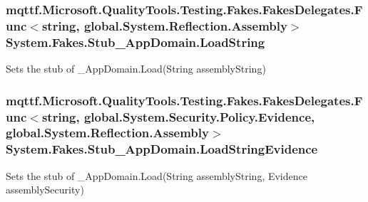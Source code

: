 \hypertarget{class_system_1_1_fakes_1_1_stub___app_domain_ad13b6d5b06033084171149e73dc4bdf8}{
\subsubsection[{Load\-String}]{\setlength{\rightskip}{0pt plus 5cm}mqttf.\-Microsoft.\-Quality\-Tools.\-Testing.\-Fakes.\-Fakes\-Delegates.\-Func$<$string, global.\-System.\-Reflection.\-Assembly$>$ System.\-Fakes.\-Stub\-\_\-\-App\-Domain.\-Load\-String}}\label{class_system_1_1_fakes_1_1_stub___app_domain_ad13b6d5b06033084171149e73dc4bdf8}


Sets the stub of \-\_\-\-App\-Domain.\-Load(\-String assembly\-String)

\hypertarget{class_system_1_1_fakes_1_1_stub___app_domain_ab7ae3c6e6b27a52a39860fd5ca6789e6}{
\subsubsection[{Load\-String\-Evidence}]{\setlength{\rightskip}{0pt plus 5cm}mqttf.\-Microsoft.\-Quality\-Tools.\-Testing.\-Fakes.\-Fakes\-Delegates.\-Func$<$string, global.\-System.\-Security.\-Policy.\-Evidence, global.\-System.\-Reflection.\-Assembly$>$ System.\-Fakes.\-Stub\-\_\-\-App\-Domain.\-Load\-String\-Evidence}}\label{class_system_1_1_fakes_1_1_stub___app_domain_ab7ae3c6e6b27a52a39860fd5ca6789e6}


Sets the stub of \-\_\-\-App\-Domain.\-Load(\-String assembly\-String, Evidence assembly\-Security)

